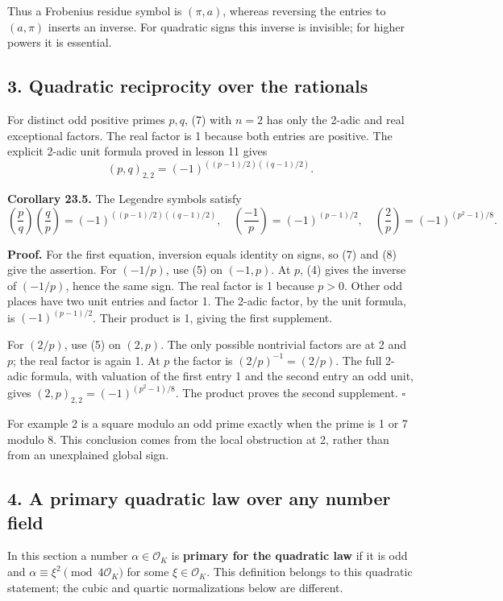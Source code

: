 \documentclass[11pt,a4paper]{article}
\begin{document}
Thus a Frobenius residue symbol is \((\pi,a)\), whereas reversing the
entries to \((a,\pi)\) inserts an inverse. For quadratic signs this
inverse is invisible; for higher powers it is essential.

\subsection{3. Quadratic reciprocity over the
rationals}\label{quadratic-reciprocity-over-the-rationals}

For distinct odd positive primes \(p,q\), (7) with \(n=2\) has only the
2-adic and real exceptional factors. The real factor is 1 because both
entries are positive. The explicit 2-adic unit formula proved in lesson
11 gives \[
(p,q)_{2,2}=(-1)^{((p-1)/2)((q-1)/2)}.
\tag{8}
\]

\textbf{Corollary 23.5.} The Legendre symbols satisfy \[
\left(\frac p q\right)\left(\frac q p\right)
=(-1)^{((p-1)/2)((q-1)/2)},\quad
\left(\frac{-1}p\right)=(-1)^{(p-1)/2},\quad
\left(\frac2p\right)=(-1)^{(p^2-1)/8}.
\tag{9}
\]

\textbf{Proof.} For the first equation, inversion equals identity on
signs, so (7) and (8) give the assertion. For \((-1/p)\), use (5) on
\((-1,p)\). At \(p\), (4) gives the inverse of \((-1/p)\), hence the
same sign. The real factor is 1 because \(p>0\). Other odd places have
two unit entries and factor 1. The 2-adic factor, by the unit formula,
is \((-1)^{(p-1)/2}\). Their product is 1, giving the first supplement.

For \((2/p)\), use (5) on \((2,p)\). The only possible nontrivial
factors are at 2 and \(p\); the real factor is again 1. At \(p\) the
factor is \((2/p)^{-1}=(2/p)\). The full 2-adic formula, with valuation
of the first entry 1 and the second entry an odd unit, gives
\((2,p)_{2,2}=(-1)^{(p^2-1)/8}\). The product proves the second
supplement. \(\square\)

For example 2 is a square modulo an odd prime exactly when the prime is
1 or 7 modulo 8. This conclusion comes from the local obstruction at 2,
rather than from an unexplained global sign.

\subsection{4. A primary quadratic law over any number
field}\label{a-primary-quadratic-law-over-any-number-field}

In this section a number \(\alpha\in\mathcal O_K\) is \textbf{primary
for the quadratic law} if it is odd and
\(\alpha\equiv\xi^2\pmod{4\mathcal O_K}\) for some
\(\xi\in\mathcal O_K\). This definition belongs to this quadratic
statement; the cubic and quartic normalizations below are different.
\end{document}

